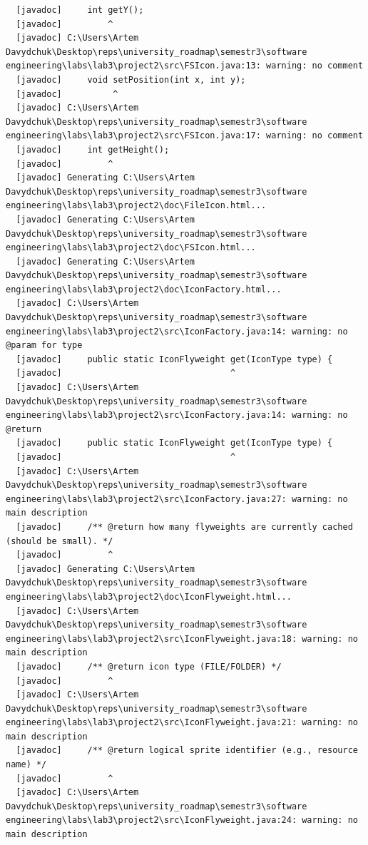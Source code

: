 \documentclass[12pt,a4paper]{article}
\begin{document}
\begin{verbatim}
  [javadoc]     int getY();
  [javadoc]         ^
  [javadoc] C:\Users\Artem Davydchuk\Desktop\reps\university_roadmap\semestr3\software engineering\labs\lab3\project2\src\FSIcon.java:13: warning: no comment
  [javadoc]     void setPosition(int x, int y);
  [javadoc]          ^
  [javadoc] C:\Users\Artem Davydchuk\Desktop\reps\university_roadmap\semestr3\software engineering\labs\lab3\project2\src\FSIcon.java:17: warning: no comment
  [javadoc]     int getHeight();
  [javadoc]         ^
  [javadoc] Generating C:\Users\Artem Davydchuk\Desktop\reps\university_roadmap\semestr3\software engineering\labs\lab3\project2\doc\FileIcon.html...
  [javadoc] Generating C:\Users\Artem Davydchuk\Desktop\reps\university_roadmap\semestr3\software engineering\labs\lab3\project2\doc\FSIcon.html...
  [javadoc] Generating C:\Users\Artem Davydchuk\Desktop\reps\university_roadmap\semestr3\software engineering\labs\lab3\project2\doc\IconFactory.html...
  [javadoc] C:\Users\Artem Davydchuk\Desktop\reps\university_roadmap\semestr3\software engineering\labs\lab3\project2\src\IconFactory.java:14: warning: no @param for type
  [javadoc]     public static IconFlyweight get(IconType type) {
  [javadoc]                                 ^
  [javadoc] C:\Users\Artem Davydchuk\Desktop\reps\university_roadmap\semestr3\software engineering\labs\lab3\project2\src\IconFactory.java:14: warning: no @return
  [javadoc]     public static IconFlyweight get(IconType type) {
  [javadoc]                                 ^
  [javadoc] C:\Users\Artem Davydchuk\Desktop\reps\university_roadmap\semestr3\software engineering\labs\lab3\project2\src\IconFactory.java:27: warning: no main description
  [javadoc]     /** @return how many flyweights are currently cached (should be small). */
  [javadoc]         ^
  [javadoc] Generating C:\Users\Artem Davydchuk\Desktop\reps\university_roadmap\semestr3\software engineering\labs\lab3\project2\doc\IconFlyweight.html...
  [javadoc] C:\Users\Artem Davydchuk\Desktop\reps\university_roadmap\semestr3\software engineering\labs\lab3\project2\src\IconFlyweight.java:18: warning: no main description
  [javadoc]     /** @return icon type (FILE/FOLDER) */
  [javadoc]         ^
  [javadoc] C:\Users\Artem Davydchuk\Desktop\reps\university_roadmap\semestr3\software engineering\labs\lab3\project2\src\IconFlyweight.java:21: warning: no main description
  [javadoc]     /** @return logical sprite identifier (e.g., resource name) */
  [javadoc]         ^
  [javadoc] C:\Users\Artem Davydchuk\Desktop\reps\university_roadmap\semestr3\software engineering\labs\lab3\project2\src\IconFlyweight.java:24: warning: no main description

\end{verbatim}
\end{document}
